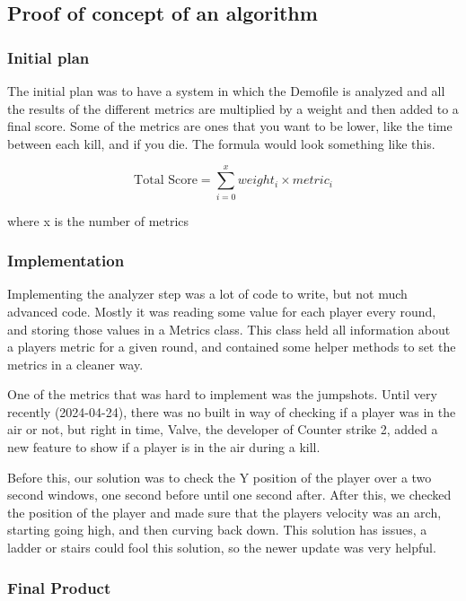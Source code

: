 \subsection{Proof of concept of an algorithm}

\subsubsection{Initial plan}
The initial plan was to have a system in which the \Gls{Demofile} is analyzed and all the results of the different metrics are multiplied by a weight and then added to a final score. Some of the metrics are ones that you want to be lower, like the time between each kill, and if you die. The formula would look something like this.

$$\text{Total Score} = \sum_{i=0}^{x} weight_i \times metric_i $$

where x is the number of metrics

\subsubsection{Implementation}

Implementing the analyzer step was a lot of code to write, but not much advanced code. Mostly it was reading some value for each player every round, and storing those values in a Metrics class. This class held all information about a players metric for a given round, and contained some helper methods to set the metrics in a cleaner way.

One of the metrics that was hard to implement was the \Gls{jumpshot}s. Until very recently (2024-04-24), there was no built in way of checking if a player was in the air or not, but right in time, Valve, the developer of Counter strike 2, added a new feature\cite{onTheOtherHandReleaseNotes} to show if a player is in the air during a kill.

Before this, our solution was to check the Y position of the player over a two second windows, one second before until one second after. After this, we checked the position of the player and made sure that the players velocity was an arch, starting going high, and then curving back down. This solution has issues, a ladder or stairs could fool this solution, so the newer update was very helpful.

\subsubsection{Final Product}

